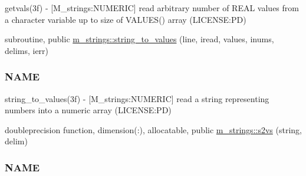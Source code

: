 \begin{DoxyCompactItemize}
\begin{DoxyCompactList}
getvals(3f) -\/ \mbox{[}M\+\_\+strings\+:N\+U\+M\+E\+R\+IC\mbox{]} read arbitrary number of R\+E\+AL values from a character variable up to size of V\+A\+L\+U\+E\+S() array (L\+I\+C\+E\+N\+SE\+:PD) \end{DoxyCompactList}\item 
subroutine, public \mbox{\hyperlink{namespacem__strings_af3767887ce5c2373a6d9061ea6664bfc}{m\+\_\+strings\+::string\+\_\+to\+\_\+values}} (line, iread, values, inums, delims, ierr)
\begin{DoxyCompactList}\small\item\em \subsubsection*{N\+A\+ME}

string\+\_\+to\+\_\+values(3f) -\/ \mbox{[}M\+\_\+strings\+:N\+U\+M\+E\+R\+IC\mbox{]} read a string representing numbers into a numeric array (L\+I\+C\+E\+N\+SE\+:PD) \end{DoxyCompactList}\item 
doubleprecision function, dimension(\+:), allocatable, public \mbox{\hyperlink{namespacem__strings_ad7fffe79559a666aa28e1ed598b8670f}{m\+\_\+strings\+::s2vs}} (string, delim)
\begin{DoxyCompactList}\small\item\em \subsubsection*{N\+A\+ME}


\end{DoxyCompactList}
\end{DoxyCompactItemize}
